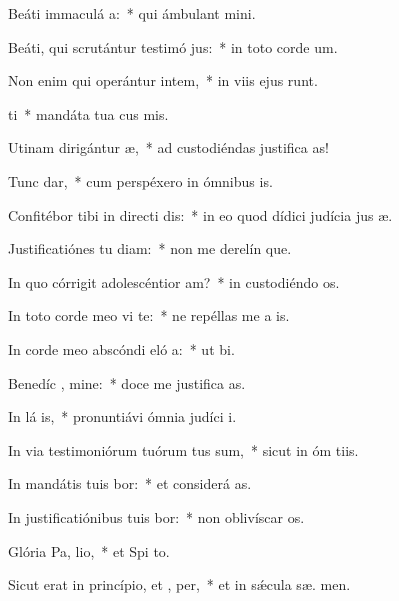 \item Beáti immaculá  a:~* qui ámbulant   mini.
\item Beáti, qui scrutántur testimó jus:~* in toto corde  um.
\item Non enim qui operántur intem,~* in viis ejus runt.
\item {} ti~* mandáta tua cus mis.
\item Utinam dirigántur  æ,~* ad custodiéndas justifica as!
\item Tunc  dar,~* cum perspéxero in ómnibus  is.
\item Confitébor tibi in directi dis:~* in eo quod dídici judícia jus æ.
\item Justificatiónes tu diam:~* non me derelín que.
\item In quo córrigit adolescéntior  am?~* in custodiéndo  os.
\item In toto corde meo vi te:~* ne repéllas me a  is.
\item In corde meo abscóndi eló a:~* ut   bi.
\item Benedíc , mine:~* doce me justifica as.
\item In lá is,~* pronuntiávi ómnia judíci  i.
\item In via testimoniórum tuórum tus sum,~* sicut in óm tiis.
\item In mandátis tuis bor:~* et considerá  as.
\item In justificatiónibus tuis bor:~* non oblivíscar  os.
\item Glória Pa,  lio,~* et Spi to.
\item Sicut erat in princípio, et ,  per,~* et in sǽcula sæ. men.

